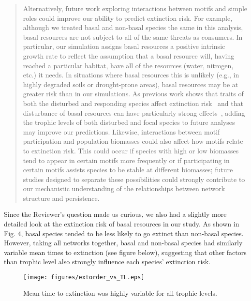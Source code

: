 \documentclass[12pt]{article}
\begin{document}
    \begin{quotation}
        Alternatively, future work exploring interactions between motifs and simple roles could improve our ability to predict extinction risk.
        For example, although we treated basal and non-basal species the same in this analysis, basal resources are not subject to all of the same threats as consumers.
        In particular, our simulation assigns basal resources a positive intrinsic growth rate to reflect the assumption that a basal resource will, having reached a particular habitat, have all of the resources (water, nitrogen, etc.) it needs. 
        In situations where basal resources this is unlikely (e.g., in highly degraded soils or drought-prone areas), basal resources may be at greater risk than in our simulations.
        As previous work shows that traits of both the disturbed and responding species affect extinction risk~\citep{Wootton2016} and that disturbance of basal resources can have particularly strong effects~\citep{Scherber2010}, adding the trophic levels of both disturbed and focal species to future analyses may improve our predictions.
        Likewise, interactions between motif participation and population biomasses could also affect how motifs relate to extinction risk.
        This could occur if species with high or low biomasses tend to appear in certain motifs more frequently or if participating in certain motifs assists species to be stable at different biomasses; future studies designed to separate these possibilities could strongly contribute to our mechanistic understanding of the relationships between network structure and persistence.
    \end{quotation}


    Since the Reviewer's question made us curious, we also had a slightly more detailed look at the extinction risk of basal resources in our study.
    As shown in Fig. 4, basal species tended to be less likely to go extinct than non-basal species. However, taking all networks together, basal and non-basal species had similarly variable mean times to extinction (see figure below), suggesting that other factors than trophic level also strongly influence each species' extinction risk. 

    \begin{figure}[hb!]
      \centering
      \texttt{[image: figures/extorder\_vs\_TL.eps]}
      \caption{Mean time to extinction was highly variable for all trophic levels.}
    \end{figure}
\end{document}
